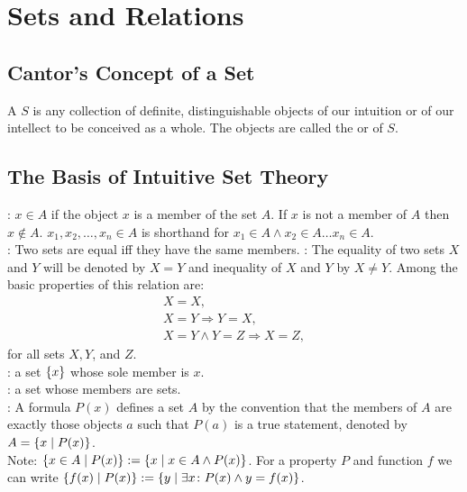\documentclass[12pt]{book}
\begin{document}
\chapter{Sets and Relations}

\section{Cantor's Concept of a Set}
A  $S$ is any collection of definite, distinguishable objects of our intuition or of our intellect to be conceived as a whole. The objects are called the  or  of $S$.

\section{The Basis of Intuitive Set Theory}
: $x \in A$ if the object $x$ is a member of the set $A$. If $x$ is not a member of $A$ then $x \notin A$. $x_1, x_2, \dots, x_n \in A$ is shorthand for $x_1 \in A \wedge x_2 \in A \dots x_n \in A$.\\
: Two sets are equal iff they have the same members.
: The equality of two sets $X$ and $Y$ will be denoted by $X = Y$ and inequality of $X$ and $Y$ by $X \neq Y$. Among the basic properties of this relation are:
\begin{gather*}
X = X,\\X = Y \Rightarrow Y = X,\\ X = Y \wedge Y = Z \Rightarrow X = Z,
\end{gather*}
for all sets $X, Y$, and $Z$.\\
: a set $\{x\}$ whose sole member is $x$.\\
: a set whose members are sets.\\
: A formula $P(x)$ defines a set $A$ by the convention that the members of $A$ are exactly those objects $a$ such that $P(a)$ is a true statement, denoted by $A = \{x \mid P(x)\}$.\\
Note: $\{x \in A \mid P(x)\} := \{x \mid x \in A \wedge P(x)\}$. For a property $P$ and function $f$ we can write $\{f(x)\mid P(x)\} := \{y \mid \exists x\colon P(x) \wedge y = f(x)\}$.
\end{document}
